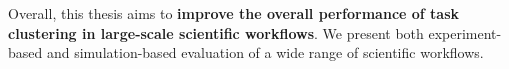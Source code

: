 

Overall, this thesis aims to \textbf{improve the overall performance of task clustering in large-scale scientific workflows}. We present both experiment-based and simulation-based evaluation of a wide range of scientific workflows. 
 


